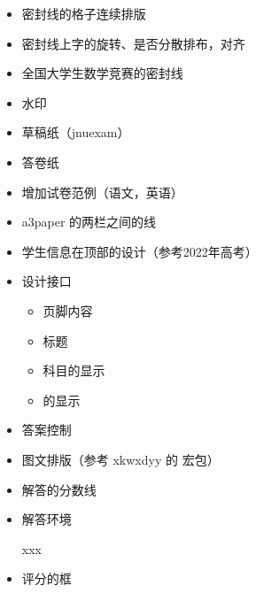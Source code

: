 \documentclass{ccnudoc}
\begin{document}
\begin{itemize}
  \item 密封线的格子连续排版
  \item 密封线上字的旋转、是否分散排布，对齐
  \item 全国大学生数学竞赛的密封线
  \item 水印
  \item 草稿纸（jnuexam）
  \item 答卷纸
  \item 增加试卷范例（语文，英语）
  \item a3paper 的两栏之间的线
    \begin{latexcode}[gobble = 6]
      \setlength{\columnseprule}{0.4pt}
    \end{latexcode}
  \item 学生信息在顶部的设计（参考2022年高考）
  \item 设计接口
    \begin{itemize}
      \item 页脚内容
      \item 标题
      \item 科目的显示
      \item {} 的显示
    \end{itemize}
  \item 答案控制
  \item 图文排版（参考 xkwxdyy 的  宏包）
  \item 解答的分数线
  \item 解答环境
    \begin{latexcode}[gobble = 6]
      \begin{solution}
        xxx
      \end{solution}

    \end{latexcode}
  \item 评分的框
\end{itemize}

\end{document}
